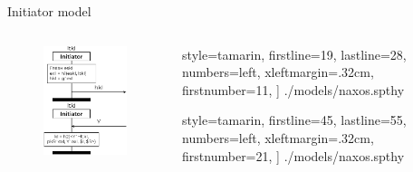 \documentclass[11pt,aspectratio=169]{beamer}
\begin{document}
\begin{frame}[fragile]{Initiator model}
    \begin{columns}
        \begin{column}{0.45\textwidth}
            \begin{figure}
                \includegraphics[width=.7\textwidth]
                    {./figures/lecture_6/naxos_init}%
            \end{figure}
        \end{column}
        \begin{column}{0.55\textwidth}
            
                style=tamarin,
                firstline=19,
                lastline=28,
                numbers=left,
                xleftmargin=.32cm,
                firstnumber=11,
            ] {./models/naxos.spthy}%
            
                style=tamarin,
                firstline=45,
                lastline=55,
                numbers=left,
                xleftmargin=.32cm,
                firstnumber=21,
            ] {./models/naxos.spthy}
        \end{column}
    \end{columns}
\end{frame}
\end{document}
